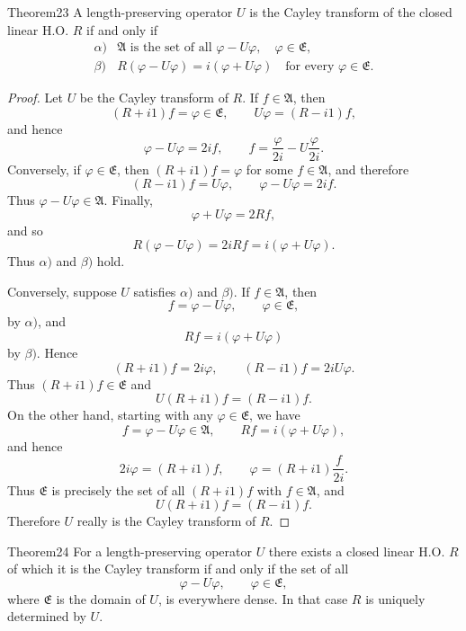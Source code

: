 ﻿\documentclass[paper=b5,fontsize=13pt,bookmarkpackage=false,twoside]{scrartcl}
\begin{document}
\begin{namedstatement}{Theorem}{23}\label{thm:23}
A length-preserving operator $U$ is the Cayley transform of the closed linear H.O. $R$ if and only if
\[
\begin{array}{ll}
\alpha)&\mathfrak A\text{ is the set of all }\varphi-U\varphi,\quad\varphi\in\mathfrak E,\\[1mm]
\beta)&R(\varphi-U\varphi)=i(\varphi+U\varphi)\quad\text{for every }\varphi\in\mathfrak E.
\end{array}
\]
\end{namedstatement}

\begin{proof}
Let $U$ be the Cayley transform of $R$. If $f\in\mathfrak A$, then
\[
(R+i1)f=\varphi\in\mathfrak E,\qquad U\varphi=(R-i1)f,
\]
and hence
\[
\varphi-U\varphi=2if,\qquad
f=\frac{\varphi}{2i}-U\frac{\varphi}{2i}.
\]
Conversely, if $\varphi\in\mathfrak E$, then $(R+i1)f=\varphi$ for some $f\in\mathfrak A$, and therefore
\[
(R-i1)f=U\varphi,\qquad
\varphi-U\varphi=2if.
\]
Thus $\varphi-U\varphi\in\mathfrak A$. Finally,
\[
\varphi+U\varphi=2Rf,
\]
and so
\[
R(\varphi-U\varphi)=2iRf=i(\varphi+U\varphi).
\]
Thus $\alpha)$ and $\beta)$ hold.

Conversely, suppose $U$ satisfies $\alpha)$ and $\beta)$. If $f\in\mathfrak A$, then
\[
f=\varphi-U\varphi,\qquad \varphi\in\mathfrak E,
\]
by $\alpha)$, and
\[
Rf=i(\varphi+U\varphi)
\]
by $\beta)$. Hence
\[
(R+i1)f=2i\varphi,\qquad (R-i1)f=2iU\varphi.
\]
Thus $(R+i1)f\in\mathfrak E$ and
\[
U(R+i1)f=(R-i1)f.
\]
On the other hand, starting with any $\varphi\in\mathfrak E$, we have
\[
f=\varphi-U\varphi\in\mathfrak A,\qquad
Rf=i(\varphi+U\varphi),
\]
and hence
\[
2i\varphi=(R+i1)f,\qquad
\varphi=(R+i1)\frac{f}{2i}.
\]
Thus $\mathfrak E$ is precisely the set of all $(R+i1)f$ with $f\in\mathfrak A$, and
\[
U(R+i1)f=(R-i1)f.
\]
Therefore $U$ really is the Cayley transform of $R$.
\end{proof}

\begin{namedstatement}{Theorem}{24}\label{thm:24}
For a length-preserving operator $U$ there exists a closed linear H.O. $R$ of which it is the Cayley transform if and only if the set of all
\[
\varphi-U\varphi,\qquad\varphi\in\mathfrak E,
\]
where $\mathfrak E$ is the domain of $U$, is everywhere dense. In that case $R$ is uniquely determined by $U$.
\end{namedstatement}
\end{document}
